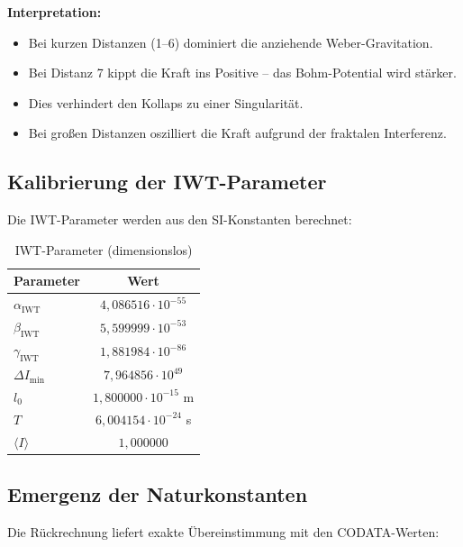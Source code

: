 \documentclass[12pt,a4paper]{article}
\begin{document}
\textbf{Interpretation:}
\begin{itemize}
\item Bei kurzen Distanzen (1--6) dominiert die anziehende Weber-Gravitation.
\item Bei Distanz 7 kippt die Kraft ins Positive -- das Bohm-Potential wird stärker.
\item Dies verhindert den Kollaps zu einer Singularität.
\item Bei großen Distanzen oszilliert die Kraft aufgrund der fraktalen Interferenz.
\end{itemize}

\subsection{Kalibrierung der IWT-Parameter}

Die IWT-Parameter werden aus den SI-Konstanten berechnet:

\begin{table}[H]
\centering
\begin{tabular}{l|c}
Parameter & Wert \\
\hline
$\alpha_{\text{IWT}}$ & $4,086516 \cdot 10^{-55}$ \\
$\beta_{\text{IWT}}$ & $5,599999 \cdot 10^{-53}$ \\
$\gamma_{\text{IWT}}$ & $1,881984 \cdot 10^{-86}$ \\
$\Delta I_{\min}$ & $7,964856 \cdot 10^{49}$ \\
$l_0$ & $1,800000 \cdot 10^{-15}$ m \\
$T$ & $6,004154 \cdot 10^{-24}$ s \\
$\langle I \rangle$ & $1,000000$ \\
\end{tabular}
\caption{IWT-Parameter (dimensionslos)}
\label{tab:iwt_params}
\end{table}

\subsection{Emergenz der Naturkonstanten}

Die Rückrechnung liefert exakte Übereinstimmung mit den CODATA-Werten:
\end{document}
